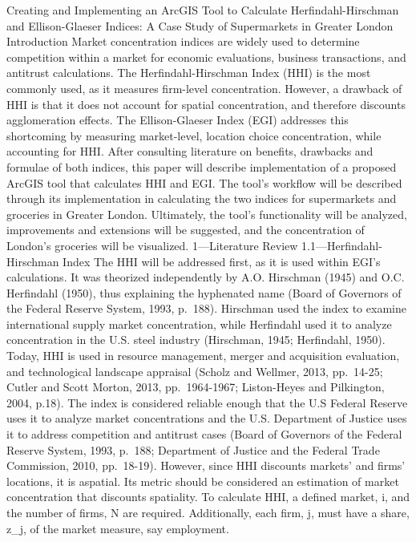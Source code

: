 \documentclass[]{article}
\begin{document}
Creating and Implementing an ArcGIS Tool to Calculate
Herfindahl-Hirschman and Ellison-Glaeser Indices: A Case Study of
Supermarkets in Greater London Introduction Market concentration indices
are widely used to determine competition within a market for economic
evaluations, business transactions, and antitrust calculations. The
Herfindahl-Hirschman Index (HHI) is the most commonly used, as it
measures firm-level concentration. However, a drawback of HHI is that it
does not account for spatial concentration, and therefore discounts
agglomeration effects. The Ellison-Glaeser Index (EGI) addresses this
shortcoming by measuring market-level, location choice concentration,
while accounting for HHI. After consulting literature on benefits,
drawbacks and formulae of both indices, this paper will describe
implementation of a proposed ArcGIS tool that calculates HHI and EGI.
The tool's workflow will be described through its implementation in
calculating the two indices for supermarkets and groceries in Greater
London. Ultimately, the tool's functionality will be analyzed,
improvements and extensions will be suggested, and the concentration of
London's groceries will be visualized. 1---Literature Review
1.1---Herfindahl-Hirschman Index The HHI will be addressed first, as it
is used within EGI's calculations. It was theorized independently by
A.O. Hirschman (1945) and O.C. Herfindahl (1950), thus explaining the
hyphenated name (Board of Governors of the Federal Reserve System, 1993,
p.~188). Hirschman used the index to examine international supply market
concentration, while Herfindahl used it to analyze concentration in the
U.S. steel industry (Hirschman, 1945; Herfindahl, 1950). Today, HHI is
used in resource management, merger and acquisition evaluation, and
technological landscape appraisal (Scholz and Wellmer, 2013, pp.~14-25;
Cutler and Scott Morton, 2013, pp.~1964-1967; Liston-Heyes and
Pilkington, 2004, p.18). The index is considered reliable enough that
the U.S Federal Reserve uses it to analyze market concentrations and the
U.S. Department of Justice uses it to address competition and antitrust
cases (Board of Governors of the Federal Reserve System, 1993, p.~188;
Department of Justice and the Federal Trade Commission, 2010,
pp.~18-19). However, since HHI discounts markets' and firms' locations,
it is aspatial. Its metric should be considered an estimation of market
concentration that discounts spatiality. To calculate HHI, a defined
market, i, and the number of firms, N are required. Additionally, each
firm, j, must have a share, z\_j, of the market measure, say employment.
\end{document}
